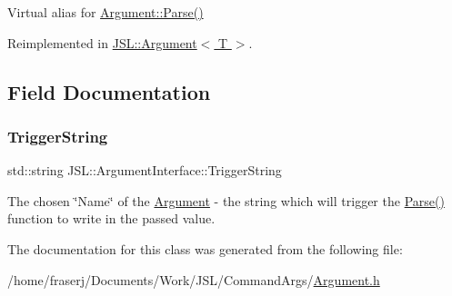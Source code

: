 Virtual alias for \hyperlink{classJSL_1_1Argument_a8984e7ce23155259d90a3e98170f36e0}{Argument\+::\+Parse()} 



Reimplemented in \hyperlink{classJSL_1_1Argument_a8984e7ce23155259d90a3e98170f36e0}{J\+S\+L\+::\+Argument$<$ T $>$}.



\subsection{Field Documentation}
\mbox{\label{classJSL_1_1ArgumentInterface_afa2d1f96c4971070d3de5824f297312f}} 
\subsubsection{\texorpdfstring{Trigger\+String}{TriggerString}}
{\footnotesize\ttfamily std\+::string J\+S\+L\+::\+Argument\+Interface\+::\+Trigger\+String\hspace{0.3cm}{\ttfamily [protected]}}



The chosen \char`\"{}\+Name\char`\"{} of the \hyperlink{classJSL_1_1Argument}{Argument} -\/ the string which will trigger the \hyperlink{classJSL_1_1ArgumentInterface_a28b487f7a4fa6e721ed6629abe2073f2}{Parse()} function to write in the passed value. 



The documentation for this class was generated from the following file\+:\begin{DoxyCompactItemize}
\item 
/home/fraserj/\+Documents/\+Work/\+J\+S\+L/\+Command\+Args/\hyperlink{Argument_8h}{Argument.\+h}\end{DoxyCompactItemize}
